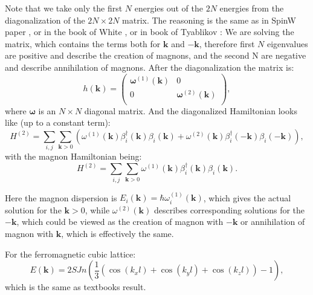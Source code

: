 \documentclass[a4paper,12pt]{article}
\begin{document}
            Note that we take only the first $N$ energies out of the $2N$ energies from the 
            diagonalization of the $2N\times 2N$ matrix. The reasoning is the same as in SpinW paper \cite{toth2015linear}, 
            or in the book of White \cite{white1983quantum}, or in book of Tyablikov \cite{Tyablikov1975methods}: 
            We are solving the matrix, which contains the terms both for $\boldsymbol{k}$ and $-\boldsymbol{k}$, therefore first $N$ eigenvalues are positive and describe the creation of magnons, 
            and the second N are negative and describe annihilation of magnons. After the diagonalization the matrix is:
            \begin{equation}
                h(\boldsymbol{k}) = 
                \begin{pmatrix}
                    \boldsymbol{\omega}^{(1)}(\boldsymbol{k}) & 0 \\
                    0 & \boldsymbol{\omega}^{(2)}(\boldsymbol{k}) \\
                \end{pmatrix}, 
            \end{equation}
            where $\boldsymbol{\omega}$ is an $N\times N$  diagonal matrix. And the diagonalized Hamiltonian looks like (up to a constant term):
            \begin{equation}
                H^{(2)} = \sum_{i,j}\sum_{\boldsymbol{k} > 0}\left(\omega^{(1)}(\boldsymbol{k})\beta^{\dag}_i(\boldsymbol{k})\beta_i(\boldsymbol{k}) + 
                \omega^{(2)}(\boldsymbol{k})\beta^{\dag}_i(-\boldsymbol{k})\beta_i(-\boldsymbol{k})\right),
            \end{equation}
            with the magnon Hamiltonian being:
            \begin{equation}
                H^{(2)} = \sum_{i,j}\sum_{\boldsymbol{k} > 0}\omega^{(1)}(\boldsymbol{k})\beta^{\dag}_i(\boldsymbol{k})\beta_i(\boldsymbol{k}).
            \end{equation}

            Here the magnon dispersion is $E_i(\boldsymbol{k}) = \hbar \omega_i^{(1)}(\boldsymbol{k})$, 
            which gives the actual solution for the $\boldsymbol{k} > 0$, while $\omega^{(2)}(\boldsymbol{k})$ describes corresponding solutions for the $-\boldsymbol{k}$, 
            which could be viewed as the creation of magnon with $-\boldsymbol{k}$ or annihilation of magnon with $\boldsymbol{k}$, which is effectively the same.
            
            For the ferromagnetic cubic lattice:
            \begin{equation}
                E(\boldsymbol{k}) = 2SJn\left(\dfrac{1}{3}\left(\cos(k_xl) + \cos(k_yl) + \cos(k_zl)\right) - 1\right),
            \end{equation}
            which is the same as textbooks result.
\end{document}
